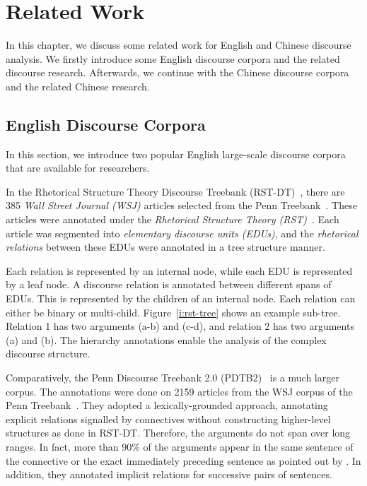 %
%
%
\chapter{Related Work}
\label{c:related}

In this chapter, we discuss some related work for English and Chinese discourse
analysis. We firstly introduce some English discourse corpora and the
related discourse research. Afterwards, we continue with the Chinese
discourse corpora and the related Chinese research.

\section{English Discourse Corpora}

In this section, we introduce two popular English large-scale discourse
corpora that are available for researchers.

In the Rhetorical Structure Theory Discourse Treebank (RST-DT)~\citep{Carlson01building},
there are 385 \textit{Wall Street Journal (WSJ)} articles selected from
the Penn Treebank~\citep{marcus1993building}. These articles were annotated under
the \textit{Rhetorical Structure Theory (RST)}~\citep{mann-thompson88}.
Each article was segmented into \textit{elementary discourse units (EDUs)}, and the
\textit{rhetorical relations} between these EDUs were annotated in a tree structure
manner.

Each relation is represented by an internal node, while each EDU is represented
by a leaf node. A discourse relation is annotated between different spans of EDUs.
This is represented by the children of an internal node. Each relation can
either be binary or multi-child. Figure~\ref{i:rst-tree} shows an example sub-tree.
Relation 1 has two arguments (a-b) and (c-d), and relation 2 has two
arguments (a) and (b).
The hierarchy annotations enable the analysis of the complex discourse structure.



Comparatively, the Penn Discourse Treebank 2.0 (PDTB2)~\citep{Prasad08thepenn}
is a much larger corpus. The annotations were done on 2159 articles from
the WSJ corpus of the Penn Treebank~\citep{marcus1993building}. They adopted a lexically-grounded
approach, annotating explicit relations signalled by connectives without constructing higher-level
structures as done in RST-DT. Therefore, the arguments do not span over long ranges. In fact,
more than 90\% of the arguments appear in the same sentence of the connective or the
exact immediately preceding sentence as pointed out by \cite{kong2014a}.
In addition, they annotated implicit relations for successive pairs of sentences.


